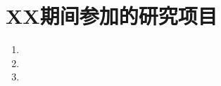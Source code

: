 \section*{XX期间参加的研究项目}
\begin{enumerate}
\renewcommand{\labelenumi}{[\theenumi]}
\item 
\item 
\item 
\end{enumerate}
